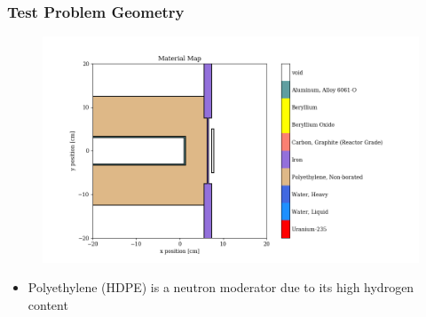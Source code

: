 \documentclass[t]{beamer}
\begin{document}
\begin{frame}
  \frametitle{Test Problem Geometry}
  \begin{figure}
    \includegraphics[trim={0.7in 0.2in 0.9in 0.45in},clip,scale=0.45]{images/material_map.png}
  \end{figure}
  \begin{itemize}
    \item Polyethylene (HDPE) is a neutron moderator due to its high hydrogen content
  \end{itemize}
\end{frame}
\end{document}
